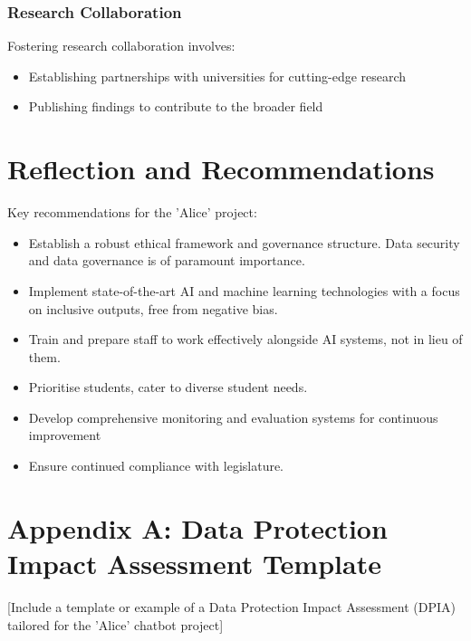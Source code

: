 \documentclass[14pt,a4paper]{article}
\begin{document}
\begin{multicols}{2}
\subsubsection*{Research Collaboration}
Fostering research collaboration \textit{\parencite[pp. 50-100]{Dillenbourg2023}} involves:
\begin{itemize}
    \item Establishing partnerships with universities for cutting-edge research
    \item Publishing findings to contribute to the broader field
\end{itemize}

\section{Reflection and Recommendations}

Key recommendations for the 'Alice' project:
\begin{itemize}
  \item Establish a robust ethical framework and governance structure. Data security and data governance is of paramount importance.
  \item Implement state-of-the-art AI and machine learning technologies with a focus on inclusive outputs, free from negative bias.
  \item Train and prepare staff to work effectively alongside AI systems, not in lieu of them.
  \item Prioritise students, cater to diverse student needs.
  \item Develop comprehensive monitoring and evaluation systems for continuous improvement
  \item Ensure continued compliance with legislature.
\end{itemize}



\end{multicols}

\newpage
\appendix
\section{Appendix A: Data Protection Impact Assessment Template}\label{appendix:a}
[Include a template or example of a Data Protection Impact Assessment (DPIA) tailored for the 'Alice' chatbot project]
\end{document}
